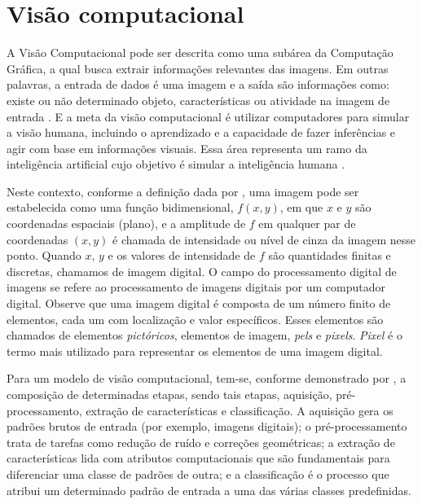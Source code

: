 \documentclass[
	12pt,				%
	oneside,			%
	a4paper,			%
	english,			%
	brazil				%
	]{abntex2ppgsi}
\begin{document}
\section{Visão computacional}
A Visão Computacional pode ser descrita como uma subárea da Computação Gráfica, a qual busca extrair informações relevantes das imagens. Em outras palavras, a entrada de dados é uma imagem e a saída são informações como: existe ou não determinado objeto, características ou atividade na imagem de entrada \cite{rebelo2021fully}. E a meta da visão computacional é utilizar computadores para simular a visão humana, incluindo o aprendizado e a capacidade de fazer inferências e agir com base em informações visuais. Essa área representa um ramo da inteligência artificial cujo objetivo é simular a inteligência humana \cite{gonzalez2000processamento}.

Neste contexto, conforme a definição dada por , uma imagem pode ser estabelecida como uma função bidimensional, $f(x,y)$, em que $x$ e $y$ são coordenadas espaciais (plano), e a amplitude de $f$ em qualquer par de coordenadas $(x,y)$ é chamada de intensidade ou nível de cinza da imagem nesse ponto. Quando $x$, $y$ e os valores de intensidade de $f$ são quantidades finitas e discretas, chamamos de imagem digital. O campo do processamento digital de imagens se refere ao processamento de imagens digitais por um computador digital. Observe que uma imagem digital é composta de um número finito de elementos, cada um com localização e valor específicos. Esses elementos são chamados de elementos \textit{pictóricos}, elementos de imagem, \textit{pels} e \textit{pixels}. \textit{Pixel} é o termo mais utilizado para representar os elementos de uma imagem digital.

Para um modelo de visão computacional, tem-se, conforme demonstrado por , a composição de determinadas etapas, sendo tais etapas, aquisição, pré-processamento, extração de características e classificação. A aquisição gera os padrões brutos de entrada (por exemplo, imagens digitais); o pré-processamento trata de tarefas como redução de ruído e correções geométricas; a extração de características lida com atributos computacionais que são fundamentais para diferenciar uma classe de padrões de outra; e a classificação é o processo que atribui um determinado padrão de entrada a uma das várias classes predefinidas.
\end{document}
